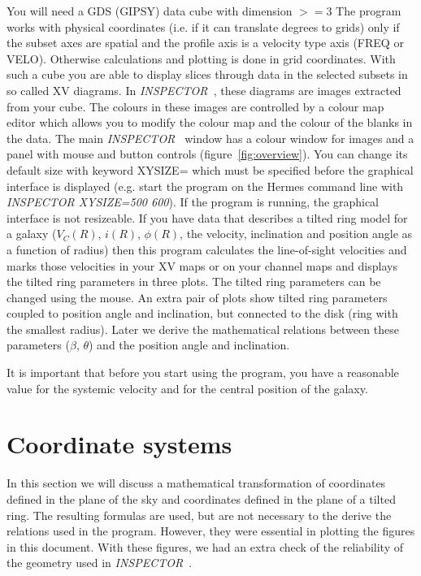 \documentclass[11pt,a4paper]{article}
\begin{document}
 
You will need a GDS (GIPSY) data cube with dimension $>= 3$
The program works with physical coordinates (i.e. if it can translate
degrees to grids) only if the subset axes are spatial and the profile 
axis is  a velocity type axis (FREQ or VELO). Otherwise calculations
and plotting is done in grid coordinates.
With such a cube you are able   
to display slices through data in the selected subsets in so called   
XV diagrams.
In {\it INSPECTOR\ }, these diagrams are images extracted 
from your cube. The colours in these images are controlled
by a colour map editor which allows you to modify the colour map and
the colour of the blanks in the data.
The main {\it INSPECTOR\ } window has a colour window for images and a 
panel with
mouse and button controls (figure~\ref{fig:overview}). 
You can change its default size with keyword XYSIZE= which must be
specified before the graphical interface is displayed 
(e.g. start the program on the Hermes command line with {\it INSPECTOR XYSIZE=500 600}).
If the program is running, the graphical interface is not resizeable.
If you have data that describes a tilted ring 
model for a galaxy ($V_{C}(R)$, $i(R)$, $\phi(R)$, the velocity, 
inclination and position angle as a function of radius)
then this program calculates the line-of-sight velocities
and marks those velocities in your XV maps or on your channel maps 
and displays the tilted ring parameters in three plots. 
The tilted ring parameters can be changed using the mouse.
An extra pair of plots show tilted ring parameters coupled to position angle and
inclination, but connected to the disk (ring with the smallest radius).
Later we derive the mathematical relations between these parameters ($\beta$, $\theta$)
and the position angle and inclination.

It is important that before you start using the program, you have a 
reasonable value for the systemic velocity and for the central position of the galaxy.


\section{Coordinate systems}
In this section we will discuss a mathematical transformation of 
coordinates defined in the plane of the sky and coordinates 
defined in the plane of a tilted ring. The resulting formulas 
are used, but are not necessary to the derive the relations used in the program.
However, they were essential in
plotting the figures in this document. With these figures, we 
had an extra check of the reliability of the geometry used in 
{\it INSPECTOR\ }.
\end{document}
